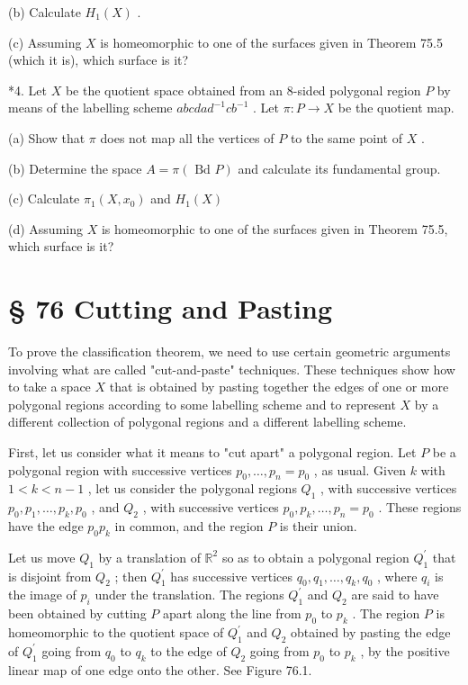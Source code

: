 (b) Calculate \({H}_{1}\left( X\right)\) .

(c) Assuming \(X\) is homeomorphic to one of the surfaces given in Theorem 75.5 (which it is), which surface is it?

*4. Let \(X\) be the quotient space obtained from an 8-sided polygonal region \(P\) by means of the labelling scheme \({abcda}{d}^{-1}c{b}^{-1}\) . Let \(\pi  : P \rightarrow  X\) be the quotient map.

(a) Show that \(\pi\) does not map all the vertices of \(P\) to the same point of \(X\) .

(b) Determine the space \(A = \pi \left( {\text{ Bd }P}\right)\) and calculate its fundamental group.

(c) Calculate \({\pi }_{1}\left( {X,{x}_{0}}\right)\) and \({H}_{1}\left( X\right)\)

(d) Assuming \(X\) is homeomorphic to one of the surfaces given in Theorem 75.5, which surface is it?

\section*{§ 76 Cutting and Pasting}

To prove the classification theorem, we need to use certain geometric arguments involving what are called "cut-and-paste" techniques. These techniques show how to take a space \(X\) that is obtained by pasting together the edges of one or more polygonal regions according to some labelling scheme and to represent \(X\) by a different collection of polygonal regions and a different labelling scheme.

First, let us consider what it means to "cut apart" a polygonal region. Let \(P\) be a polygonal region with successive vertices \({p}_{0},\ldots ,{p}_{n} = {p}_{0}\) , as usual. Given \(k\) with \(1 < k < n - 1\) , let us consider the polygonal regions \({Q}_{1}\) , with successive vertices \({p}_{0},{p}_{1},\ldots ,{p}_{k},{p}_{0}\) , and \({Q}_{2}\) , with successive vertices \({p}_{0},{p}_{k},\ldots ,{p}_{n} = {p}_{0}\) . These regions have the edge \({p}_{0}{p}_{k}\) in common, and the region \(P\) is their union.

Let us move \({Q}_{1}\) by a translation of \({\mathbb{R}}^{2}\) so as to obtain a polygonal region \({Q}_{1}^{\prime }\) that is disjoint from \({Q}_{2}\) ; then \({Q}_{1}^{\prime }\) has successive vertices \({q}_{0},{q}_{1},\ldots ,{q}_{k},{q}_{0}\) , where \({q}_{i}\) is the image of \({p}_{i}\) under the translation. The regions \({Q}_{1}^{\prime }\) and \({Q}_{2}\) are said to have been obtained by cutting \(P\) apart along the line from \({p}_{0}\) to \({p}_{k}\) . The region \(P\) is homeomorphic to the quotient space of \({Q}_{1}^{\prime }\) and \({Q}_{2}\) obtained by pasting the edge of \({Q}_{1}^{\prime }\) going from \({q}_{0}\) to \({q}_{k}\) to the edge of \({Q}_{2}\) going from \({p}_{0}\) to \({p}_{k}\) , by the positive linear map of one edge onto the other. See Figure 76.1.

